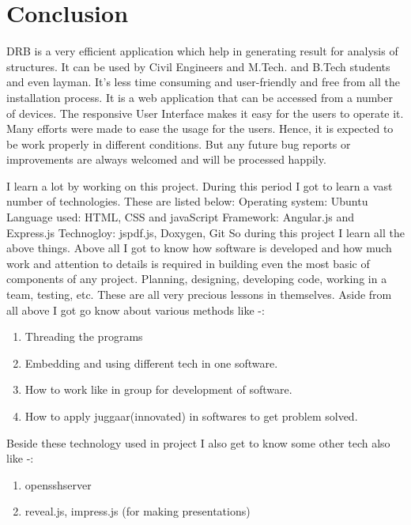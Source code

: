 \section{Conclusion}
DRB is a very efficient application which help in generating result for analysis of structures. It
can be used by Civil Engineers and M.Tech. and B.Tech students and even layman. It's less time consuming and user-friendly 
and free from all the installation process. It is a web application that can be accessed from a number of devices. The responsive User Interface makes it easy for the users to operate it. Many efforts were made to ease the usage for the users. Hence, it is expected to be work properly in different conditions. But any future bug reports or improvements are always welcomed and will be processed happily.

I learn a lot by working on this project. During this period I got to learn a vast number of
technologies. These are listed below:
Operating system: Ubuntu
Language used: HTML, CSS and javaScript
Framework: Angular.js and Express.js
Technogloy: jspdf.js, Doxygen, Git 
So during this project I learn  all the above things. Above all I got to know how software is
developed and how much work and attention to details is required in building even the most basic
of components of any project. Planning, designing, developing code, working in a team, testing,
etc. These are all very precious lessons in themselves.
Aside from all above I got go know about various methods like -:
\begin{enumerate}
\item Threading the programs 
\item Embedding and using different tech in one software.
\item How to work like in group for development of software.
\item How to apply juggaar(innovated) in softwares to get problem solved. 
\end{enumerate}

Beside these technology used in project I also get to know some other tech also like -:
\begin{enumerate}
\item opensshserver 
\item reveal.js, impress.js (for making presentations)
\end{enumerate}  


